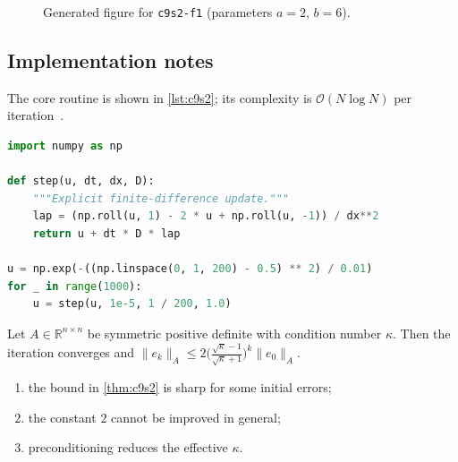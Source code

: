 \begin{figure}[htbp]
\centering
{}
\caption{Generated figure for \texttt{c9s2-f1} (parameters $a=2$, $b=6$).}\label{fig:c9s2-f1}
\end{figure}

\kant[8-10]

\subsection{Implementation notes}\label{sec:c9s2-i}
The core routine is shown in \cref{lst:c9s2}; its complexity is $\mathcal{O}(N\log N)$ per iteration~\cite{main-31}.

\begin{lstlisting}[language=python,caption={Reference implementation for c9s2.},label={lst:c9s2}]
import numpy as np

def step(u, dt, dx, D):
    """Explicit finite-difference update."""
    lap = (np.roll(u, 1) - 2 * u + np.roll(u, -1)) / dx**2
    return u + dt * D * lap

u = np.exp(-((np.linspace(0, 1, 200) - 0.5) ** 2) / 0.01)
for _ in range(1000):
    u = step(u, 1e-5, 1 / 200, 1.0)
\end{lstlisting}

\kant[3-10]
\begin{theorem}\label{thm:c9s2}
Let $A\in\mathbb{R}^{n\times n}$ be symmetric positive definite with condition number $\kappa$. Then the iteration converges and
$\lVert e_k\rVert_A \le 2\bigl(\tfrac{\sqrt\kappa-1}{\sqrt\kappa+1}\bigr)^k\lVert e_0\rVert_A$.
\end{theorem}
\begin{enumerate}[label=(\roman*)]
\item the bound in \cref{thm:c9s2} is sharp for some initial errors;
\item the constant $2$ cannot be improved in general;
\item preconditioning reduces the effective $\kappa$.
\end{enumerate}

\lipsum[63-63]
